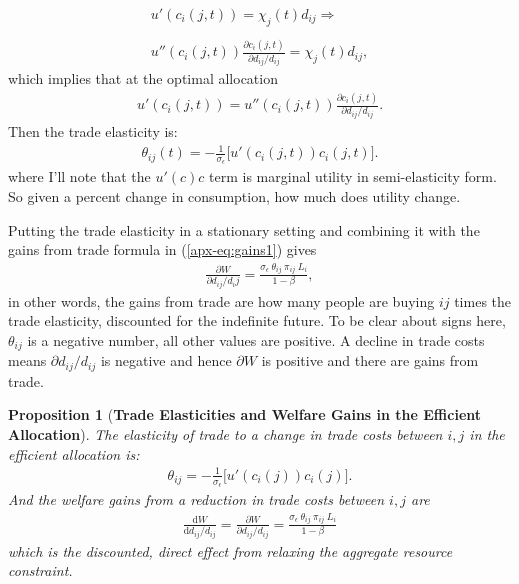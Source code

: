 \documentclass[12pt,pdftex]{article}
\newtheorem{prp}{Proposition}
\begin{document}
\begin{onehalfspacing}
\begin{align}
u'(c_{i}(j,t) ) = \chi_{j}(t) d_{ij} \Rightarrow \\
\nonumber \\
u''(c_{i}(j,t))\frac{\partial c_{i}(j,t)}{\partial d_{ij} / d_{ij}} = \chi_{j}(t)d_{ij},
\end{align}
which implies that at the optimal allocation
\begin{align}
u'(c_{i}(j,t) ) =  u''(c_{i}(j,t))\frac{\partial c_{i}(j,t)}{\partial d_{ij} / d_{ij}}. \label{apx-eq:muc-fact}
\end{align}
Then the trade elasticity is:
\begin{align}
\theta_{ij}(t) =  -\frac{1}{\sigma_{\epsilon}} \bigg [ u'(c_{i}(j,t)) c_{i}(j,t) \bigg].
\end{align}
where I'll note that the $u'(c)c$ term is marginal utility in semi-elasticity form. So given a percent change in consumption, how much does utility change. 

Putting the trade elasticity in a stationary setting and combining it with the gains from trade formula in (\ref{apx-eq:gains1}) gives
\begin{align}
\frac{\partial W}{\partial d_{ij} / d_ij} =  \frac{\sigma_{\epsilon} \ \theta_{ij} \ \pi_{ij} \ L_{i}}{1-\beta} ,
\end{align}
in other words, the gains from trade are how many people are buying $ij$ times the trade elasticity, discounted for the indefinite future. To be clear about signs here, $\theta_{ij}$ is a negative number, all other values are positive. A decline in trade costs means $\partial d_{ij} / d_{ij}$ is negative and hence $\partial W$ is positive and there are gains from trade.

\begin{prp}[\textbf{Trade Elasticities and Welfare Gains in the Efficient Allocation}]\label{apx-prp:gains-efficient-allocation} The elasticity of trade to a change in trade costs between $i,j$ in the efficient allocation is:
\begin{align}
\theta_{ij} =  -\frac{1}{\sigma_{\epsilon}} \bigg [ u'(c_{i}(j)) c_{i}(j) \bigg]. \label{apx-eq:eff-trade-elasticity}
\end{align}
And the welfare gains from a reduction in trade costs between $i,j$ are
\begin{align}
\frac{\mathrm{d} W}{\mathrm{d} d_{ij} / d_{ij}} = \frac{\partial W}{\partial d_{ij} / d_{ij}} =  \frac{\sigma_{\epsilon} \ \theta_{ij} \ \pi_{ij} \ L_i}{1-\beta}
\label{apx-eq:eff-trade-gains}
\end{align}
which is the discounted, direct effect from relaxing the aggregate resource constraint.
\end{prp}


\end{onehalfspacing}
\end{document}
